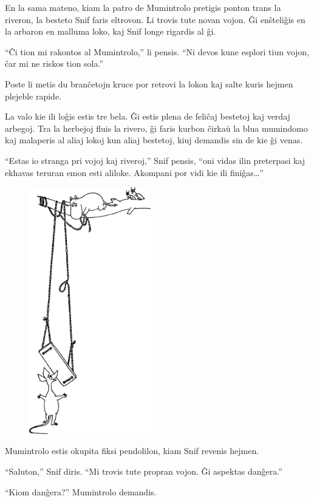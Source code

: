En la sama mateno, kiam la patro de Mumintrolo pretigis ponton trans la riveron, la besteto Snif faris eltrovon. Li trovis tute novan vojon. Ĝi enŝteliĝis en la arbaron en malluma loko, kaj Snif longe rigardis al ĝi.

``Ĉi tion mi rakontos al Mumintrolo,'' li pensis. ``Ni devos kune esplori tiun vojon, ĉar mi ne riskos tion sola.''

Poste li metis du branĉetojn kruce por retrovi la lokon kaj salte kuris hejmen plejeble rapide.

La valo kie ili loĝis estis tre bela. Ĝi estis plena de feliĉaj bestetoj kaj verdaj arbegoj. Tra la herbejoj fluis la rivero, ĝi faris kurbon ĉirkaŭ la blua mumindomo kaj malaperis al aliaj lokoj kun aliaj bestetoj, kiuj demandis sin de kie ĝi venas.

``Estas io stranga pri vojoj kaj riveroj,'' Snif pensis, ``oni vidas ilin preterpasi kaj ekhavas teruran emon esti aliloke. Akompani por vidi kie ili finiĝas{\ldots}''

\sectionbreak

\begin{figure}
\includegraphics[width=150pt,height=305pt]{1-2.png}\end{figure}

Mumintrolo estis okupita fiksi pendolilon, kiam Snif revenis hejmen.

``Saluton,'' Snif diris. ``Mi trovis tute propran vojon. Ĝi aspektas danĝera.''

``Kiom danĝera?'' Mumintrolo demandis.

